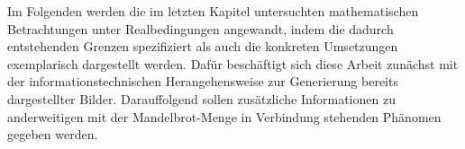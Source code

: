 
Im Folgenden werden die im letzten Kapitel untersuchten mathematischen Betrachtungen
unter Realbedingungen angewandt, indem die dadurch entstehenden Grenzen
spezifiziert als auch die konkreten Umsetzungen exemplarisch dargestellt werden.
Dafür beschäftigt sich diese Arbeit zunächst mit der informationstechnischen
Herangehensweise zur Generierung bereits dargestellter Bilder.
Darauffolgend sollen zusätzliche Informationen zu anderweitigen mit der
Mandelbrot-Menge in Verbindung stehenden Phänomen gegeben werden.


